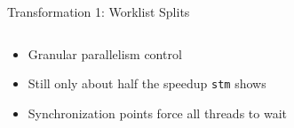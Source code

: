 \documentclass[aspectratio=169, usenames, dvipsnames]{beamer}
\begin{document}
\begin{frame}{Transformation 1: Worklist Splits}
  \begin{columns}
    \begin{column}{0.45\textwidth}
      \begin{itemize}
        \item<3-> Granular parallelism control
        \item<4-> Still only about half the speedup \alert{\texttt{stm}} shows
      \end{itemize}

      \vspace{1.5em}
      \begin{itemize}
        \item<6-> Synchronization points force all threads to wait
      \end{itemize}
    \end{column}
    \begin{column}{0.55\textwidth}
      \centering%
    \end{column}
  \end{columns}
\end{frame}
\end{document}
